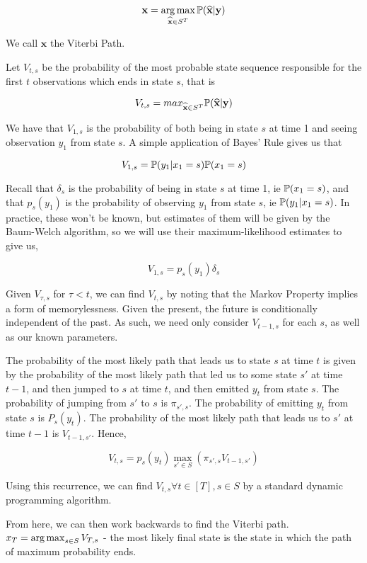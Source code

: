 $$
\mathbf{x} = \operatorname*{arg\,max}_{\widehat{\mathbf{x}} \in S^T} \mathbb{P}(\mathbf{\widehat{x}} | \mathbf{y})
$$

We call $\mathbf{x}$ the Viterbi Path.

Let $V_{t,s}$ be the probability of the most probable state sequence responsible for the first $t$ observations which ends in state $s$, that is

$$
V_{t,s} = max_{\mathbf{\widehat{x}} \in S^T} \mathbb{P} (\mathbf{\widehat{x}}| \mathbf{y})
$$

We have that $V_{1,s}$ is the probability of both being in state $s$ at time 1 and seeing observation $y_1$ from state $s$. A simple application of Bayes' Rule gives us that

$$
V_{1,s} = \mathbb{P} (y_1|x_1 = s)\mathbb{P}(x_1=s)
$$

Recall that $\delta_s$ is the probability of being in state $s$ at time 1, ie $\mathbb{P}(x_1=s)$, and that $p_s(y_1)$ is the probability of observing $y_1$ from state $s$, ie $\mathbb{P} (y_1|x_1 = s)$. In practice, these won't be known, but estimates of them will be given by the Baum-Welch algorithm, so we will use their maximum-likelihood estimates to give us,

$$
V_{1,s} = p_s(y_1)\delta_s
$$

Given $V_{\tau,s}$ for $\tau < t$, we can find $V_{t,s}$ by noting that the Markov Property implies a form of memorylessness. Given the present, the future is conditionally independent of the past. As such, we need only consider $V_{t-1,s}$ for each $s$, as well as our known parameters. 

The probability of the most likely path that leads us to state $s$ at time $t$ is given by the probability of the most likely path that led us to some state $s'$ at time $t-1$, and then jumped to $s$ at time $t$, and then emitted $y_t$ from state $s$. The probability of jumping from $s'$ to $s$ is $\pi_{s',s}$. The probability of emitting $y_t$ from state $s$ is $P_s(y_t)$. The probability of the most likely path that leads us to $s'$ at time $t-1$ is $V_{t-1,s'}$. Hence,

$$
V_{t,s} = p_s(y_t) \max_{s'\in S} (\pi_{s',s}V_{t-1,s'})
$$

Using this recurrence, we can find $V_{t,s} \forall t \in [T], s \in S$ by a standard dynamic programming algorithm.

From here, we can then work backwards to find the Viterbi path. $x_T = \operatorname*{arg\,max}_{s \in S} V_{T,s}$ - the most likely final state is the state in which the path of maximum probability ends.

